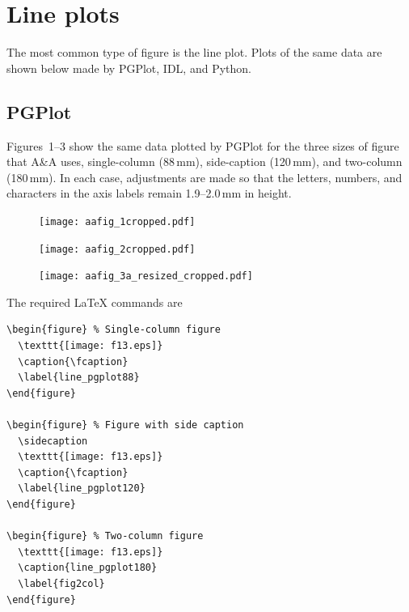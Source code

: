 \documentclass[traditabstract]{aa}
\begin{document}
\section{Line plots}

The most common type of figure is the line plot.  Plots of the same data are shown below made by PGPlot, IDL, and Python.  





\subsection{PGPlot}

Figures~1--3 show the same data plotted by PGPlot for the three sizes of figure that A\&A uses, single-column (88\,mm), side-caption (120\,mm), and two-column (180\,mm).  In each case, adjustments are made so that the letters, numbers, and characters in the axis labels remain 1.9--2.0\,mm in height.



\begin{figure} 
  \texttt{[image: aafig\_1cropped.pdf]}
  \caption{\fcaption} 
  \label{line_pgplot88}
\end{figure}



\begin{figure} 
  \sidecaption
  \texttt{[image: aafig\_2cropped.pdf]} 
  \caption{\fcaption} 
  \label{line_pgplot120}
\end{figure}



\begin{figure} 
  \texttt{[image: aafig\_3a\_resized\_cropped.pdf]}
  \caption{\fcaption} 
  \label{line_pgplot180}
\end{figure}

The required LaTeX commands are

\begin{verbatim}
\begin{figure} % Single-column figure
  \texttt{[image: f13.eps]}
  \caption{\fcaption} 
  \label{line_pgplot88}
\end{figure}

\begin{figure} % Figure with side caption
  \sidecaption
  \texttt{[image: f13.eps]} 
  \caption{\fcaption} 
  \label{line_pgplot120}
\end{figure}

\begin{figure} % Two-column figure
  \texttt{[image: f13.eps]}
  \caption{line_pgplot180} 
  \label{fig2col}
\end{figure}
\end{verbatim}
\end{document}
